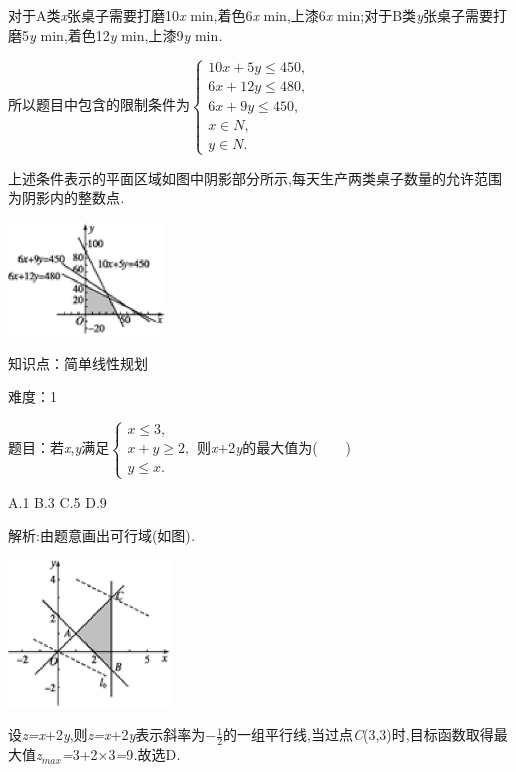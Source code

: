 \documentclass{article} %
\begin{document}
对于A类\textit{x}张桌子需要打磨10\textit{x} min,着色6\textit{x} min,上漆6\textit{x} min;对于B类\textit{y}张桌子需要打磨5\textit{y} min,着色12\textit{y} min,上漆9\textit{y} min\textit{.}

所以题目中包含的限制条件为$
\begin{cases}
10x+5y \le 450,\\
6x +12y \le 480,\\
6x+9y \le 450,\\
x \in N,\\
y \in N.
\end{cases}$

上述条件表示的平面区域如图中阴影部分所示,每天生产两类桌子数量的允许范围为阴影内的整数点\textit{.}

 \includegraphics*[width=1.65in, height=1.18in, keepaspectratio=false]{image1571}

知识点：简单线性规划

难度：1

 题目：若\textit{x},\textit{y}满足$
\begin{cases}
x \le 3,\\
x+y \ge 2,\\
y \le x.
\end{cases}$则\textit{x$+$}2\textit{y}的最大值为(\textit{　　})

 

 A.1 B.3 C.5 D.9

 解析:由题意画出可行域(如图)\textit{.}

 \includegraphics*[width=1.71in, height=1.53in, keepaspectratio=false]{image1573}

设\textit{z=x$+$}2\textit{y},则\textit{z=x$+$}2\textit{y}表示斜率为$-\frac{1}{2}$的一组平行线,当过点\textit{C}(3,3)时,目标函数取得最大值\textit{z}${}_{max}$\textit{=}3\textit{$+$}2\textit{$\times$}3\textit{=}9\textit{.}故选D\textit{.}
\end{document}
